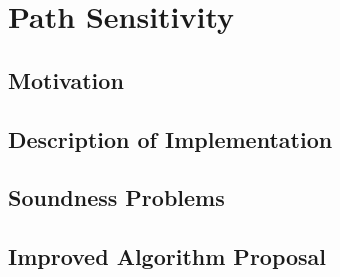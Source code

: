 \section{Path Sensitivity}
\subsection{Motivation}


\subsection{Description of Implementation}
\subsection{Soundness Problems}
\subsection{Improved Algorithm Proposal}

